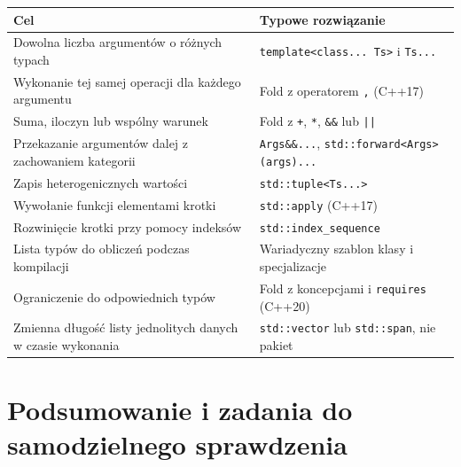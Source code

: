 \begin{center}
\small
\begin{tabular}{|p{}|p{}|}
\hline
\textbf{Cel} & \textbf{Typowe rozwiązanie} \\
\hline
Dowolna liczba argumentów o różnych typach & \texttt{template<class... Ts>} i \texttt{Ts...} \\
\hline
Wykonanie tej samej operacji dla każdego argumentu & Fold z operatorem \texttt{,} (C++17) \\
\hline
Suma, iloczyn lub wspólny warunek & Fold z \texttt{+}, \texttt{*}, \texttt{\&\&} lub \texttt{||} \\
\hline
Przekazanie argumentów dalej z zachowaniem kategorii & \texttt{Args\&\&...}, \texttt{std::forward<Args>(args)...} \\
\hline
Zapis heterogenicznych wartości & \texttt{std::tuple<Ts...>} \\
\hline
Wywołanie funkcji elementami krotki & \texttt{std::apply} (C++17) \\
\hline
Rozwinięcie krotki przy pomocy indeksów & \texttt{std::index\_sequence} \\
\hline
Lista typów do obliczeń podczas kompilacji & Wariadyczny szablon klasy i specjalizacje \\
\hline
Ograniczenie do odpowiednich typów & Fold z koncepcjami i \texttt{requires} (C++20) \\
\hline
Zmienna długość listy jednolitych danych w czasie wykonania & \texttt{std::vector} lub \texttt{std::span}, nie pakiet \\
\hline
\end{tabular}
\end{center}

\section{Podsumowanie i zadania do samodzielnego sprawdzenia}

